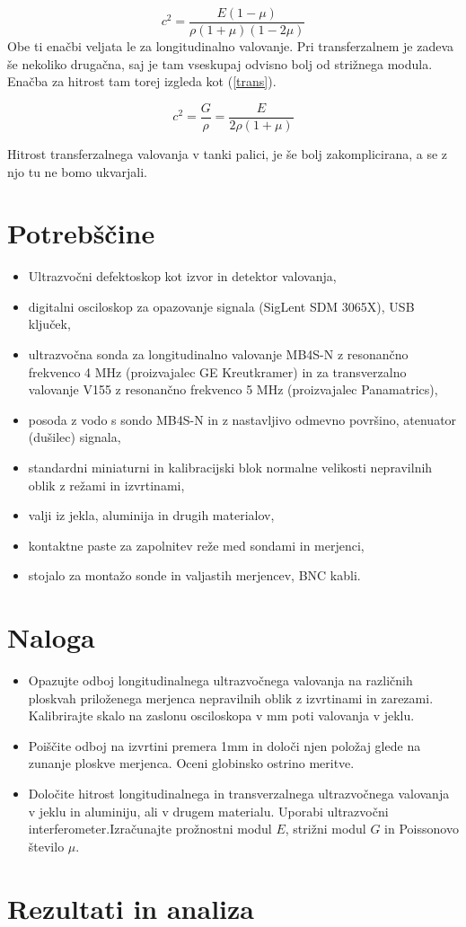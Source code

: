 \documentclass[10pt]{article}
\begin{document}
\begin{equation}
    c^{2} = \frac{E(1-\mu)}{\rho(1+\mu)(1-2\mu)}
    \label{razsežna}
\end{equation}
Obe ti enačbi veljata le za longitudinalno valovanje. Pri transferzalnem je zadeva še nekoliko drugačna, saj je tam vseskupaj odvisno bolj od strižnega modula. Enačba za hitrost tam torej izgleda kot (\ref{trans}).

\begin{equation}
    c^2 = \frac{G}{\rho} = \frac{E}{2\rho(1+\mu)}
    \label{trans}
\end{equation}

Hitrost transferzalnega valovanja v tanki palici, je še bolj zakomplicirana, a se z njo tu ne bomo ukvarjali.

\section{Potrebščine}

\begin{itemize}
    \item Ultrazvočni defektoskop kot izvor in detektor valovanja,
    \item digitalni osciloskop za opazovanje signala (SigLent SDM 3065X), USB ključek,
    \item ultrazvočna sonda za longitudinalno valovanje MB4S-N z resonančno frekvenco 4 MHz (proizvajalec GE Kreutkramer) in za transverzalno valovanje V155 z resonančno frekvenco 5 MHz (proizvajalec Panamatrics),
    \item posoda z vodo s sondo MB4S-N in z nastavljivo odmevno površino, atenuator (dušilec) signala,
    \item standardni miniaturni in kalibracijski blok normalne velikosti nepravilnih oblik z režami in izvrtinami,
    \item valji iz jekla, aluminija in drugih materialov,
    \item kontaktne paste za zapolnitev reže med sondami in merjenci,
    \item stojalo za montažo sonde in valjastih merjencev, BNC kabli.
\end{itemize}

\section{Naloga}

\begin{itemize}
    \item Opazujte odboj longitudinalnega ultrazvočnega valovanja na različnih ploskvah priloženega merjenca nepravilnih oblik z izvrtinami in zarezami. Kalibrirajte skalo na zaslonu osciloskopa v mm poti valovanja v jeklu.
    \item Poiščite odboj na izvrtini premera 1mm in določi njen položaj glede na zunanje ploskve merjenca. Oceni globinsko ostrino meritve.
    \item Določite hitrost longitudinalnega in transverzalnega ultrazvočnega valovanja v jeklu in aluminiju, ali v drugem materialu. Uporabi ultrazvočni interferometer.Izračunajte prožnostni modul $E$, strižni modul $G$ in Poissonovo število $\mu$.
\end{itemize}

\section{Rezultati in analiza}
\end{document}
